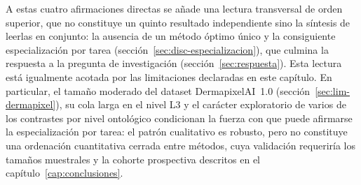 A estas cuatro afirmaciones directas se añade una lectura transversal
de orden superior, que no constituye un quinto resultado independiente
sino la síntesis de leerlas en conjunto: la ausencia de un método
óptimo único y la consiguiente especialización por tarea
(sección~\ref{sec:disc-especializacion}), que culmina la respuesta a
la pregunta de investigación (sección~\ref{sec:respuesta}). Esta
lectura está igualmente acotada por las limitaciones declaradas en
este capítulo. En particular, el tamaño moderado del dataset
DermapixelAI~1.0 (sección~\ref{sec:lim-dermapixel}), su cola larga en
el nivel L3 y el carácter exploratorio de varios de los contrastes por
nivel ontológico condicionan la fuerza con que puede afirmarse la
especialización por tarea: el patrón cualitativo es robusto, pero no
constituye una ordenación cuantitativa cerrada entre métodos, cuya
validación requeriría los tamaños muestrales y la cohorte prospectiva
descritos en el capítulo~\ref{cap:conclusiones}.
